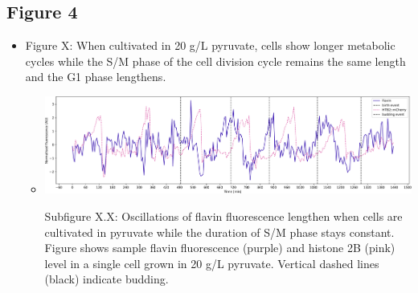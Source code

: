 \subsection{Figure 4}
\label{sec:orgf8ff501}
\begin{itemize}
\item Figure X: When cultivated in 20 g/L pyruvate, cells show longer metabolic cycles while the S/M phase of the cell division cycle remains the same length and the G1 phase lengthens.
\begin{itemize}
\item \begin{center}
\includegraphics[width=.9\linewidth]{pyruvate_single_birth_plot_edit.pdf}
\end{center} Subfigure X.X: Oscillations of flavin fluorescence lengthen when cells are cultivated in pyruvate while the duration of S/M phase stays constant.  Figure shows sample flavin fluorescence (purple) and histone 2B (pink) level in a single cell grown in 20 g/L pyruvate.  Vertical dashed lines (black) indicate budding.
\end{itemize}


\end{itemize}
